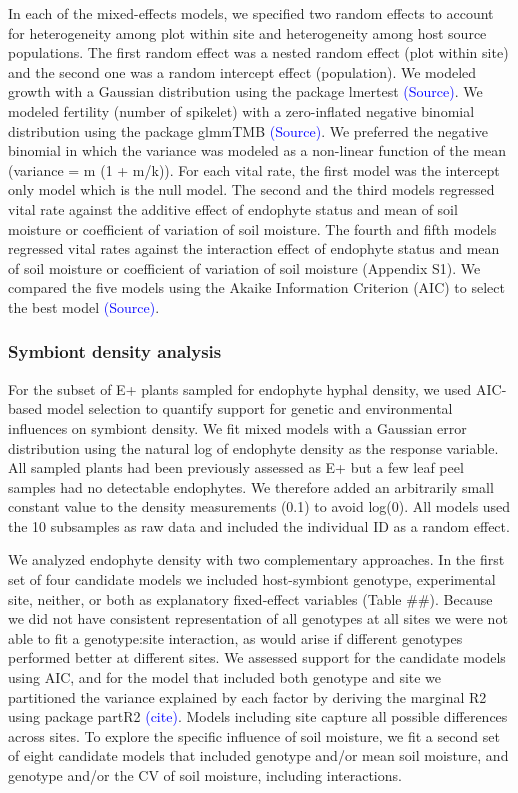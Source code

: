 \documentclass[11pt]{article}
\begin{document}
In each of the mixed-effects models, we specified two random effects to account for heterogeneity among plot within site and heterogeneity among host source populations. The first random effect was a nested random effect (plot within site) and the second one was a random intercept effect (population). We modeled growth with a Gaussian distribution using the package lmertest  \textcolor{blue}{(Source)}. We modeled fertility (number of spikelet) with a zero-inflated negative binomial distribution using the package glmmTMB  \textcolor{blue}{(Source)}. We preferred the negative binomial in which the variance was modeled as a non-linear function of the mean (variance = m (1 + m/k)). For each vital rate, the first model was the intercept only model which is the null model. The second and the third models regressed vital rate against the additive effect of endophyte status and mean of soil moisture or coefficient of variation of soil moisture. The fourth and fifth models regressed vital rates against the interaction effect of endophyte status and mean of soil moisture or coefficient of variation of soil moisture (Appendix S1). We compared the five models using the Akaike Information Criterion (AIC) to select the best model \textcolor{blue}{(Source)}. 

\subsubsection* {Symbiont density analysis}
For the subset of E+ plants sampled for endophyte hyphal density, we used AIC-based model selection to quantify support for genetic and environmental influences on symbiont density. We fit mixed models with a Gaussian error distribution using the natural log of endophyte density as the response variable. All sampled plants had been previously assessed as E+ but a few leaf peel samples had no detectable endophytes. We therefore added an arbitrarily small constant value to the density measurements (0.1) to avoid log(0). All models used the 10 subsamples as raw data and included the individual ID as a random effect. 

We analyzed endophyte density with two complementary approaches. In the first set of four candidate models we included host-symbiont genotype, experimental site, neither, or both as explanatory fixed-effect variables (Table ##). Because we did not have consistent representation of all genotypes at all sites we were not able to fit a genotype:site interaction, as would arise if different genotypes performed better at different sites. We assessed support for the candidate models using AIC, and for the model that included both genotype and site we partitioned the variance explained by each factor by deriving the marginal R2 using package partR2 \textcolor{blue}{(cite)}. Models including site capture all possible differences across sites. To explore the specific influence of soil moisture, we fit a second set of eight candidate models that included genotype and/or mean soil moisture, and genotype and/or the CV of soil moisture, including interactions. 
\end{document}
